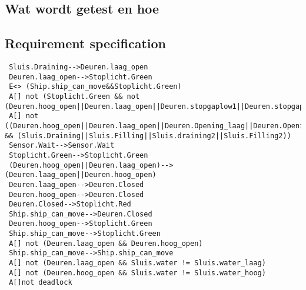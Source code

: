  \subsection{Wat wordt getest en hoe}
 
 
 \subsection{Requirement specification}
  \begin{verbatim}
 Sluis.Draining-->Deuren.laag_open
 Deuren.laag_open-->Stoplicht.Green
 E<> (Ship.ship_can_move&&Stoplicht.Green)
 A[] not (Stoplicht.Green && not (Deuren.hoog_open||Deuren.laag_open||Deuren.stopgaplow1||Deuren.stopgaplow2||Deuren.stopgaphigh1||Deuren.stopgaphigh2))
 A[] not ((Deuren.hoog_open||Deuren.laag_open||Deuren.Opening_laag||Deuren.Opening_hoog||Deuren.Closing_hoog||Deuren.Closing_laag) && (Sluis.Draining||Sluis.Filling||Sluis.draining2||Sluis.Filling2))
 Sensor.Wait-->Sensor.Wait
 Stoplicht.Green-->Stoplicht.Green
 (Deuren.hoog_open||Deuren.laag_open)-->(Deuren.laag_open||Deuren.hoog_open)
 Deuren.laag_open-->Deuren.Closed
 Deuren.hoog_open-->Deuren.Closed
 Deuren.Closed-->Stoplicht.Red
 Ship.ship_can_move-->Deuren.Closed
 Deuren.hoog_open-->Stoplicht.Green
 Ship.ship_can_move-->Stoplicht.Green
 A[] not (Deuren.laag_open && Deuren.hoog_open)
 Ship.ship_can_move-->Ship.ship_can_move
 A[] not (Deuren.laag_open && Sluis.water != Sluis.water_laag)
 A[] not (Deuren.hoog_open && Sluis.water != Sluis.water_hoog)
 A[]not deadlock
  \end{verbatim}
 
